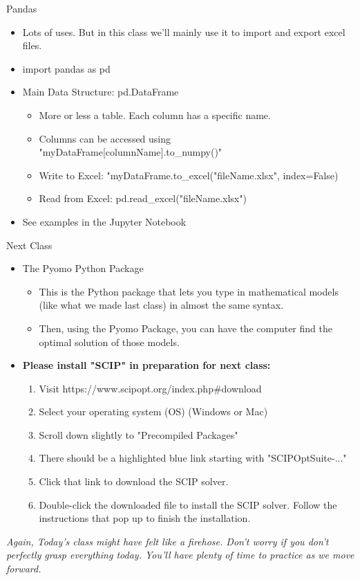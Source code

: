 \documentclass[10pt, aspectratio=169]{beamer}
\begin{document}
\begin{frame}{Pandas}
    \begin{itemize}
        \item Lots of uses. But in this class we'll mainly use it to import and export excel files.
        \item import pandas as pd
        \item Main Data Structure: pd.DataFrame
        \begin{itemize}
            \item More or less a table. Each column has a specific name.
            \item Columns can be accessed using "myDataFrame[columnName].to\_numpy()"
            \item Write to Excel: "myDataFrame.to\_excel("fileName.xlsx", index=False)
            \item Read from Excel: pd.read\_excel("fileName.xlsx")
        \end{itemize}
        \item See examples in the Jupyter Notebook
    \end{itemize}
\end{frame}

\begin{frame}{Next Class}
    \begin{itemize}
        \item The Pyomo Python Package
        \begin{itemize}
            \item This is the Python package that lets you type in mathematical models (like what we made last class) in almost the same syntax.
            \item Then, using the Pyomo Package, you can have the computer find the optimal solution of those models.
        \end{itemize}
        \item \textbf{Please install "SCIP" in preparation for next class:}
        \begin{enumerate}
            \item Visit https://www.scipopt.org/index.php\#download
            \item Select your operating system (OS) (Windows or Mac)
            \item Scroll down slightly to "Precompiled Packages"
            \item There should be a highlighted blue link starting with "SCIPOptSuite-..."
            \item Click that link to download the SCIP solver.
            \item Double-click the downloaded file to install the SCIP solver. Follow the instructions that pop up to finish the installation.
        \end{enumerate}
    \end{itemize}

    \vspace{1cm}

    \textit{Again, Today's class might have felt like a firehose. Don't worry if you don't perfectly grasp everything today. You'll have plenty of time to practice as we move forward.}

\end{frame}
\end{document}
